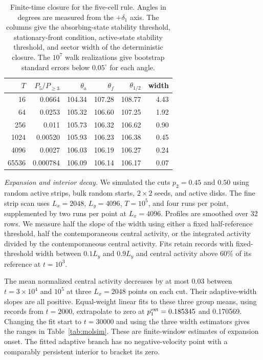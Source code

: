 \begin{table}
\caption{Finite-time closure for the five-cell rule. Angles in degrees
are measured from the $+\delta_1$ axis. The columns give the absorbing-state
stability threshold, stationary-front condition, active-state stability
threshold, and sector width of the deterministic closure. The $10^7$
walk realizations give bootstrap standard errors below $0.05^\circ$ for
each angle.}
\label{tab:molofsky}
\begin{ruledtabular}
\begin{tabular}{rrrrrr}
$T$ & $P_5/P_{\ge3}$ & $\theta_a$ & $\theta_f$ & $\theta_{1/2}$ & width\\
\hline
16 & 0.0664 & 104.34 & 107.28 & 108.77 & 4.43\\
64 & 0.0253 & 105.32 & 106.60 & 107.25 & 1.92\\
256 & 0.011 & 105.73 & 106.32 & 106.62 & 0.90\\
1024 & 0.00520 & 105.93 & 106.23 & 106.38 & 0.45\\
4096 & 0.0027 & 106.03 & 106.19 & 106.27 & 0.24\\
65536 & 0.000784 & 106.09 & 106.14 & 106.17 & 0.07\\
\end{tabular}
\end{ruledtabular}
\end{table}

\textit{Expansion and interior decay.} We simulated the cuts $p_2=0.45$
and $0.50$ using random active strips, bulk random starts, $2\times2$ seeds,
and active disks. The fine strip scan uses $L_x=2048$, $L_y=4096$,
$T=10^5$, and four runs per point, supplemented by two runs per point at
$L_x=4096$. Profiles are smoothed over 32 rows. We measure half the slope
of the width using either a fixed half-reference threshold, half the
contemporaneous central activity, or the integrated activity divided by
the contemporaneous central activity. Fits retain records with fixed-threshold
width between $0.1L_y$ and $0.9L_y$ and central activity above 60\% of its
reference at $t=10^3$.

The mean normalized central activity decreases by at most 0.03 between
$t=3\times10^4$ and $10^5$ at three $L_x=2048$ points on each cut.
Their adaptive-width slopes are all positive. Equal-weight linear fits to
these three group means, using records from $t=2000$, extrapolate to zero
at $p_1^{\rm ext}=0.185345$ and 0.170569. Changing the fit start to
$t=30000$ and using the three width estimators gives the ranges in
Table~\ref{tab:molsim}. These are finite-window estimates of expansion onset.
The fitted adaptive branch has no negative-velocity point with a comparably
persistent interior to bracket its zero.


